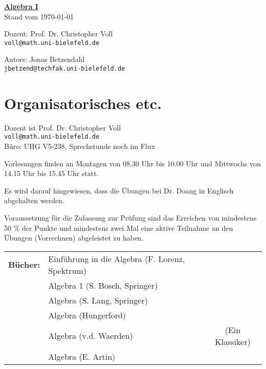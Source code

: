 \documentclass[10pt,a4paper]{article}
\author{Jonas Betzendahl}
\date{\today}
\begin{document}
\newcommand{\menge}[2]{$\{\,{#1}\,\vert\,{#2}\,\}$}
\parindent0pt

\begin{center}

\Huge \textbf{\underline{Algebra I}} \\\bigskip
\normalsize\normalsize Stand vom \today\\

\begin{multicols}{2}
Dozent: Prof. Dr. Christopher Voll\\
\texttt{voll@math.uni-bielefeld.de   }\bigskip

Autors: Jonas Betzendahl\\
\texttt{jbetzend@techfak.uni-bielefeld.de}\bigskip
\end{multicols}
\end{center}

\tableofcontents
\newpage

\section*{Organisatorisches etc.}

Dozent ist Prof. Dr. Christopher Voll\\
\texttt{voll@math.uni-bielefeld.de}\\
Büro: UHG V5-238, Sprechstunde noch im Flux\bigskip

Vorlesungen finden an Montagen von 08.30 Uhr bis 10.00 Uhr und Mittwochs von 14.15 Uhr bis 15.45 Uhr statt.\bigskip

Es wird darauf hingewiesen, dass die Übungen bei Dr. Doang in Englisch abgehalten werden.\bigskip

Voraussetzung für die Zulassung zur Prüfung sind das Erreichen von mindestens 50 \% der Punkte und mindestens zwei Mal eine aktive Teilnahme an den Übungen (Vorrechnen) abgeleistet zu haben.\bigskip

\begin{tabular}{rlc}
\textbf{Bücher:} & Einführung in die Algebra (F. Lorenz, Spektrum)&\\
        & Algebra 1 (S. Bosch, Springer)&\\
        & Algebra (S. Lang, Springer)&\\
        & Algebra (Hungerford)&\\
        & Algebra (v.d. Waerden) & (Ein Klassiker)\\
        & Algebra (E. Artin) &
\end{tabular}\bigskip
\end{document}
